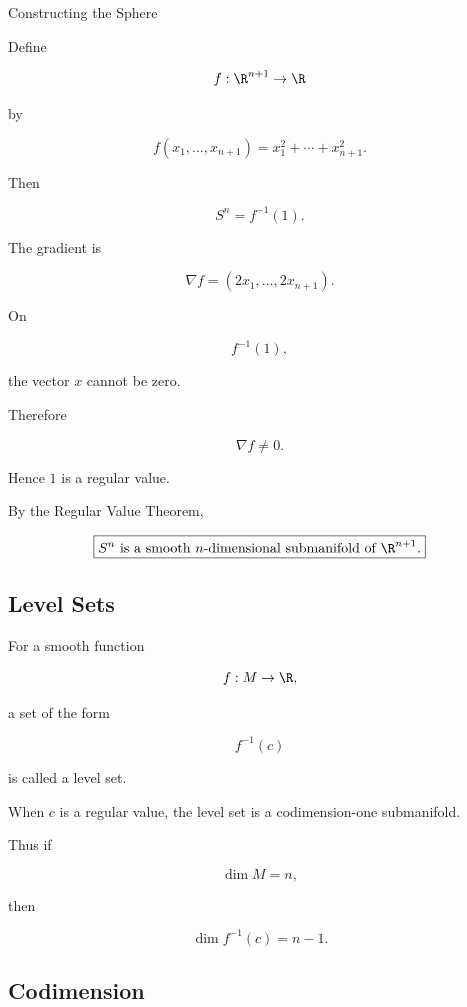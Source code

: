 \begin{workedexamplebox}{Constructing the Sphere}

Define

\[
f:\R^{n+1}\to\R
\]

by

\[
f(x_1,\ldots,x_{n+1})
=
x_1^2+\cdots+x_{n+1}^2.
\]

Then

\[
S^n=f^{-1}(1).
\]

The gradient is

\[
\nabla f
=
(2x_1,\ldots,2x_{n+1}).
\]

On

\[
f^{-1}(1),
\]

the vector \(x\) cannot be zero.

Therefore

\[
\nabla f\neq0.
\]

Hence \(1\) is a regular value.

\begin{answerbox}
By the Regular Value Theorem,

\[
\boxed{
S^n
\text{ is a smooth }n\text{-dimensional submanifold of }\R^{n+1}.
}
\]
\end{answerbox}
\end{workedexamplebox}

\subsection{Level Sets}
\label{subsec:differential-topology-level-sets}

For a smooth function

\[
f:M\to\R,
\]

a set of the form

\[
\boxed{
f^{-1}(c)
}
\]

is called a level set.

When \(c\) is a regular value, the level set is a codimension-one
submanifold.

Thus if

\[
\dim M=n,
\]

then

\[
\boxed{
\dim f^{-1}(c)=n-1.
}
\]

\subsection{Codimension}
\label{subsec:differential-topology-codimension}

